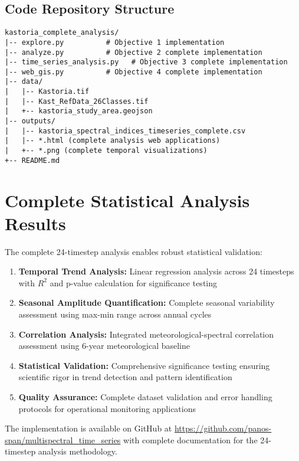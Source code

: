 \documentclass[a4paper,12pt]{article}
\begin{document}
\subsection{Code Repository Structure}

\begin{verbatim}
kastoria_complete_analysis/
|-- explore.py          # Objective 1 implementation
|-- analyze.py          # Objective 2 complete implementation  
|-- time_series_analysis.py   # Objective 3 complete implementation
|-- web_gis.py          # Objective 4 complete implementation
|-- data/
|   |-- Kastoria.tif
|   |-- Kast_RefData_26Classes.tif
|   +-- kastoria_study_area.geojson
|-- outputs/
|   |-- kastoria_spectral_indices_timeseries_complete.csv
|   |-- *.html (complete analysis web applications)
|   +-- *.png (complete temporal visualizations)
+-- README.md
\end{verbatim}

\section{Complete Statistical Analysis Results}

The complete 24-timestep analysis enables robust statistical validation:

\begin{enumerate}
    \item \textbf{Temporal Trend Analysis:} Linear regression analysis across 24 timesteps
          with $R^2$ and p-value calculation for significance testing
    \item \textbf{Seasonal Amplitude Quantification:} Complete seasonal variability
          assessment using max-min range across annual cycles  
    \item \textbf{Correlation Analysis:} Integrated meteorological-spectral correlation
          assessment using 6-year meteorological baseline
    \item \textbf{Statistical Validation:} Comprehensive significance testing ensuring
          scientific rigor in trend detection and pattern identification
    \item \textbf{Quality Assurance:} Complete dataset validation and error handling
          protocols for operational monitoring applications
\end{enumerate}

The implementation is available on GitHub at
\url{https://github.com/panos-span/multispectral_time_series} with complete
documentation for the 24-timestep analysis methodology.
\end{document}
